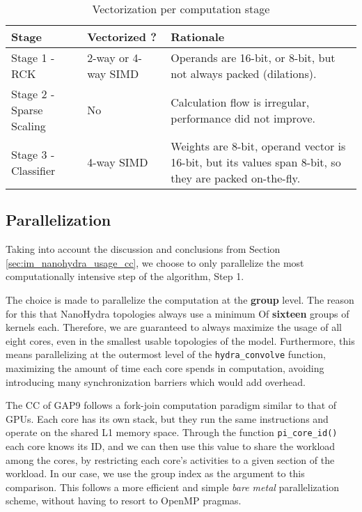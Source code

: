         \begin{table}[H]
        \begin{tabular}{||p{1.5in}|p{1.5in}|p{2.5in}||}
            \hline
            Stage & Vectorized ? & Rationale  \\

            \hline\hline
            Stage 1 - RCK            & 2-way or 4-way SIMD & Operands are 16-bit, or 8-bit, but not always packed (dilations).\\
            \hline
            Stage 2 - Sparse Scaling & No         & Calculation flow is irregular, performance did not improve.\\
            \hline
            Stage 3 - Classifier     & 4-way SIMD & Weights are 8-bit, operand vector is 16-bit, but its values span 8-bit, so they are packed on-the-fly.\\
            \hline
        \end{tabular}
        \caption{Vectorization per computation stage}
        \label{tbl:vect_summary}
        \end{table}

        \subsection{Parallelization}\label{sec:im_nanohydra_embimp_paral}

        Taking into account the discussion and conclusions from Section \ref{sec:im_nanohydra_usage_cc}, we choose to only parallelize the most computationally intensive step
        of the algorithm, Step 1. 

        The choice is made to parallelize the computation at the \textbf{group} level. The reason for this that NanoHydra topologies always use a minimum Of
        \textbf{sixteen} groups of  kernels each. Therefore, we are guaranteed to always maximize the usage of all eight cores, even in the smallest
        usable topologies of the model. Furthermore, this means parallelizing at the outermost level of the \verb|hydra_convolve| function, maximizing the amount of time
        each core spends in computation, avoiding introducing many synchronization barriers which would add overhead. 

        The CC of GAP9 follows a fork-join computation paradigm similar to that of GPUs. Each core has its own stack, but they run the same instructions and operate on the
        shared L1 memory space. Through the function \verb|pi_core_id()| each core knows its ID, and we can then use this value to share the workload among the cores, by restricting
        each core's activities to a given section of the workload. In our case, we use the group index as the argument to this comparison. This follows a more efficient and
        simple \emph{bare metal} parallelization scheme, without having to resort to OpenMP pragmas.


